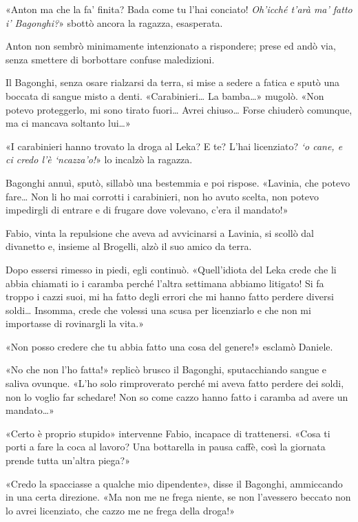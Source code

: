 «Anton ma che la fa' finita? Bada come tu l'hai conciato! \emph{Oh'icché t'arà ma' fatto i' Bagonghi?}» sbottò ancora la ragazza, esasperata.

Anton non sembrò minimamente intenzionato a rispondere; prese ed andò via, senza smettere di borbottare confuse maledizioni.

Il Bagonghi, senza osare rialzarsi da terra, si mise a sedere a fatica e sputò una boccata di sangue misto a denti. «Carabinieri\ldots{} La bamba\ldots{}» mugolò. «Non potevo proteggerlo, mi sono tirato fuori\ldots{} Avrei chiuso\ldots{} Forse chiuderò comunque, ma ci mancava soltanto lui\ldots{}»

«I carabinieri hanno trovato la droga al Leka? E te? L'hai licenziato? \emph{`o cane, e ci credo l'è `ncazza'o!}» lo incalzò la ragazza.

Bagonghi annuì, sputò, sillabò una bestemmia e poi rispose. «Lavinia, che potevo fare\ldots{} Non li ho mai corrotti i carabinieri, non ho avuto scelta, non potevo impedirgli di entrare e di frugare dove volevano, c'era il mandato!»

Fabio, vinta la repulsione che aveva ad avvicinarsi a Lavinia, si scollò dal divanetto e, insieme al Brogelli, alzò il suo amico da terra.

Dopo essersi rimesso in piedi, egli continuò. «Quell'idiota del Leka crede che li abbia chiamati io i caramba perché l'altra settimana abbiamo litigato! Si fa troppo i cazzi suoi, mi ha fatto degli errori che mi hanno fatto perdere diversi soldi\ldots{} Insomma, crede che volessi una scusa per licenziarlo e che non mi importasse di rovinargli la vita.»

«Non posso credere che tu abbia fatto una cosa del genere!» esclamò Daniele.

«No che non l'ho fatta!» replicò brusco il Bagonghi, sputacchiando sangue e saliva ovunque. «L'ho solo rimproverato perché mi aveva fatto perdere dei soldi, non lo voglio far schedare! Non so come cazzo hanno fatto i caramba ad avere un mandato\ldots{}»

«Certo è proprio stupido» intervenne Fabio, incapace di trattenersi. «Cosa ti porti a fare la coca al lavoro? Una bottarella in pausa caffè, così la giornata prende tutta un'altra piega?»

«Credo la spacciasse a qualche mio dipendente», disse il Bagonghi, ammiccando in una certa direzione. «Ma non me ne frega niente, se non l'avessero beccato non lo avrei licenziato, che cazzo me ne frega della droga!»

